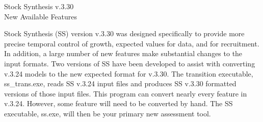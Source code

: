 \documentclass[12pt]{article}
\begin{document}
\begin{center}
	\Large{Stock Synthesis v.3.30\\
	New Available Features\\}
\end{center}

\noindent Stock Synthesis (SS) version v.3.30 was designed specifically to provide more precise temporal control of growth, expected values for data, and for recruitment.  In addition, a large number of new features make substantial changes to the input formats.  Two versions of SS have been developed to assist with converting v.3.24 models to the new expected format for v.3.30.  The transition executable, ss\_trans.exe, reads SS v.3.24 input files and produces SS v.3.30 formatted versions of those input files.  This program can convert nearly every feature in v.3.24.  However, some feature will need to be converted by hand.  The SS executable, ss.exe, will then be your primary new assessment tool.  
\end{document}
